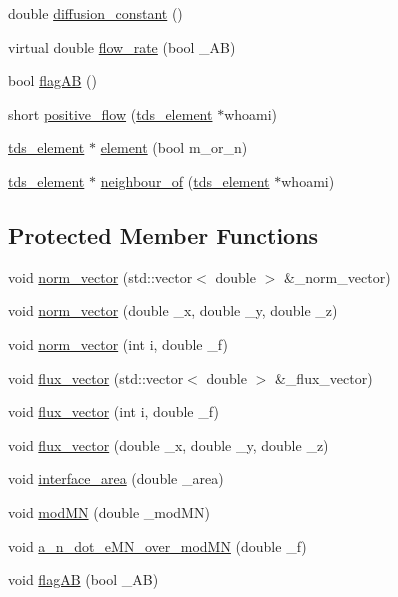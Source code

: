 \begin{DoxyCompactItemize}
\item 
double \hyperlink{classtds__element__link_a082ea48fa62b672e7ecc5fac8471bcd4}{diffusion\+\_\+constant} ()
\item 
virtual double \hyperlink{classtds__element__link_a2e4a02f2f8cc4941d15734369456f8b7}{flow\+\_\+rate} (bool \+\_\+\+AB)
\item 
bool \hyperlink{classtds__element__link_ab3e019113be7a93d6c9ab7faa6350de1}{flag\+AB} ()
\item 
short \hyperlink{classtds__element__link_a89ed003b00e4c46416ad7bf3a2d5726e}{positive\+\_\+flow} (\hyperlink{classtds__element}{tds\+\_\+element} $\ast$whoami)
\item 
\hyperlink{classtds__element}{tds\+\_\+element} $\ast$ \hyperlink{classtds__element__link_a4bb693cb080175f184165f5cde55f388}{element} (bool m\+\_\+or\+\_\+n)
\item 
\hyperlink{classtds__element}{tds\+\_\+element} $\ast$ \hyperlink{classtds__element__link_a8c8f17de458d006c051611423a261cfe}{neighbour\+\_\+of} (\hyperlink{classtds__element}{tds\+\_\+element} $\ast$whoami)
\end{DoxyCompactItemize}
\subsection*{Protected Member Functions}
\begin{DoxyCompactItemize}
\item 
void \hyperlink{classtds__element__link_a56039e834e45fba5357a3c10624dc535}{norm\+\_\+vector} (std\+::vector$<$ double $>$ \&\+\_\+norm\+\_\+vector)
\item 
void \hyperlink{classtds__element__link_a4520a07ec97ea614cbc1612f371a55ef}{norm\+\_\+vector} (double \+\_\+x, double \+\_\+y, double \+\_\+z)
\item 
void \hyperlink{classtds__element__link_a2ea4f8a444101e436803d76a2b2420a3}{norm\+\_\+vector} (int i, double \+\_\+f)
\item 
void \hyperlink{classtds__element__link_ad1f6c9650855f5512efb3c6391bba8d3}{flux\+\_\+vector} (std\+::vector$<$ double $>$ \&\+\_\+flux\+\_\+vector)
\item 
void \hyperlink{classtds__element__link_aa013152cdc8496bfb63693d5f1ff934c}{flux\+\_\+vector} (int i, double \+\_\+f)
\item 
void \hyperlink{classtds__element__link_a6a4ed11aefe84f0b9def9fed5da4aa69}{flux\+\_\+vector} (double \+\_\+x, double \+\_\+y, double \+\_\+z)
\item 
void \hyperlink{classtds__element__link_ae49a77335f5a0ae662923a995fc306eb}{interface\+\_\+area} (double \+\_\+area)
\item 
void \hyperlink{classtds__element__link_a7ad521d65162f26fb5b765ed9e3c4292}{mod\+MN} (double \+\_\+mod\+MN)
\item 
void \hyperlink{classtds__element__link_a9261e32eddd0179b59db7fc705a8b1ce}{a\+\_\+n\+\_\+dot\+\_\+e\+M\+N\+\_\+over\+\_\+mod\+MN} (double \+\_\+f)
\item 
void \hyperlink{classtds__element__link_adecad014f5537e295e74290bf6e2bb5c}{flag\+AB} (bool \+\_\+\+AB)
\end{DoxyCompactItemize}


